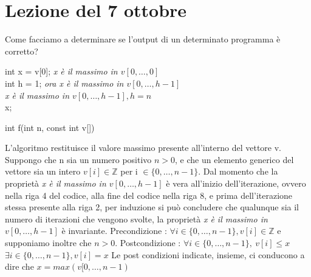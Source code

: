 \section{Lezione del 7 ottobre}
Come facciamo a determinare se l'output di un determinato programma è corretto?
\newline 
\begin{algorithm}[H]
    \SetAlgoLined
    int x = v[0]; \textit{x è il massimo in $v[0, \dots, 0]$} \\
    int h = 1; \textit{ora x è il massimo in $v[0, \dots, h-1]$}\\
    
    \textit{x è il massimo in $v[0, \dots, h-1], h = n$} \\
    \Return x;
    \caption{int f(int n, const int v[])}
\end{algorithm}

L'algoritmo restituisce il valore massimo presente all'interno del vettore v. Suppongo che n sia un numero positivo $n > 0$, e che un elemento generico del vettore sia un intero $v[i] \in \mathbb{Z}$ per i $\in \{0, \dots, n-1\}$. 
\hfill \newline \newline 
Dal momento che la proprietà \textit{x è il massimo in $v[0, \dots, h-1]$} è vera all’inizio dell’iterazione, ovvero nella riga 4 del codice, alla fine del codice nella riga 8, e prima dell’iterazione stessa presente alla riga 2, per induzione si può concludere che qualunque sia il numero di iterazioni che vengono svolte, la proprietà \textit{x è il massimo in $v[0, \dots, h-1]$} è invariante.
\newline\newline
Precondizione :  $\forall i \in  \{0, \dots, n-1\}, v[i] \in \mathbb{Z}$ e supponiamo inoltre che $n > 0$. \newline
Postcondizione : $\forall i \in  \{0, \dots, n-1\}, \ v[i] \leq x$ \newline
\hspace*{2.5cm} $\exists i \in \{0, \dots, n - 1\}, v[i] = x$ \newline
Le post condizioni indicate, insieme, ci conducono a dire che $x = max(v[0, \dots, n-1)$

